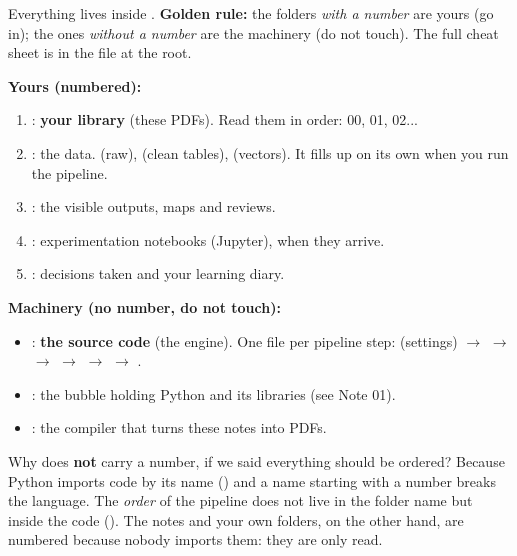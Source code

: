 \documentclass[11pt,a4paper]{article}
\begin{document}
Everything lives inside .
\textbf{Golden rule:} the folders \emph{with a number} are yours (go in); the ones
\emph{without a number} are the machinery (do not touch). The full cheat sheet is in the
file  at the root.

\textbf{Yours (numbered):}
\begin{enumerate}
  \item {}: \textbf{your library} (these PDFs). Read them in order: 00, 01, 02...
  \item {}: the data.  (raw),  (clean tables),
         (vectors). It fills up on its own when you run the pipeline.
  \item {}: the visible outputs, maps and reviews.
  \item {}: experimentation notebooks (Jupyter), when they arrive.
  \item {}: decisions taken and your learning diary.
\end{enumerate}

\textbf{Machinery (no number, do not touch):}
\begin{itemize}
  \item {}: \textbf{the source code} (the engine). One file per pipeline step:
         (settings) $\rightarrow$  $\rightarrow$
         $\rightarrow$  $\rightarrow$ 
        $\rightarrow$  $\rightarrow$ .
  \item {}: the bubble holding Python and its libraries (see Note 01).
  \item {}: the compiler that turns these notes into PDFs.
\end{itemize}

\begin{ojo}
Why does  \textbf{not} carry a number, if we said everything should be
ordered? Because Python imports code by its name () and a
name starting with a number breaks the language. The \emph{order} of the pipeline does not
live in the folder name but inside the code (). The notes
and your own folders, on the other hand, are numbered because nobody imports them: they
are only read.
\end{ojo}
\end{document}
